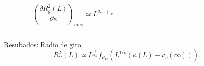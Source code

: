 \documentclass[xcolor=dvipsnames]{beamer}
\begin{document}
\begin{frame}
\begin{columns}[T]
  \begin{column}{5.8cm}
    \begin{figure}[h]
      \centering
      \resizebox{\columnwidth}{!}{}
    \end{figure}
    \begin{equation*}
      \left(\frac{\partial R_g^2(L)}{\partial \kappa}\right)_{max}\simeq
      L^{2\nu_F+\frac{1}{\nu}}
    \end{equation*}
  \end{column}
  \begin{column}{5.8cm}
    \begin{figure}[h]
      \centering
     \resizebox{\columnwidth}{!}{ }
    \end{figure}
  \end{column}
\end{columns} 
\end{frame}

\begin{frame}{Resultados: Radio de giro}
\begin{equation*}
    R^2_G(L)\simeq L^{\frac{4}{d_H}}f_{R_G}\left(L^{1/\nu}(\kappa(L)-\kappa_c(\infty))\right).
\end{equation*} 
\begin{figure}[h]
      \centering
     \resizebox{0.9\columnwidth}{!}{ }
    \end{figure}
\end{frame}
\end{document}
